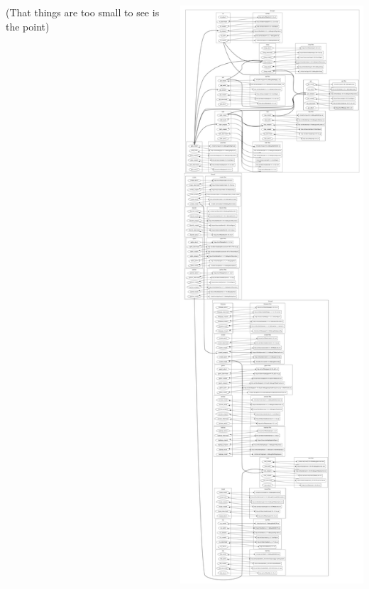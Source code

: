 \documentclass[xcolor=dvipsnames]{beamer}
\begin{document}
\begin{frame}[fragile]
\begin{columns}
\begin{column}{0.7\paperwidth}
      \begin{center}
        {\tiny (That things are too small to see is the point)}
      \end{center}
    \end{column}
    \begin{column}{0.225\paperwidth}
      \vspace{-10mm}
      \includegraphics[width=\textwidth]{pre-art}
    \end{column}
  \end{columns}
\end{frame}
\end{document}
